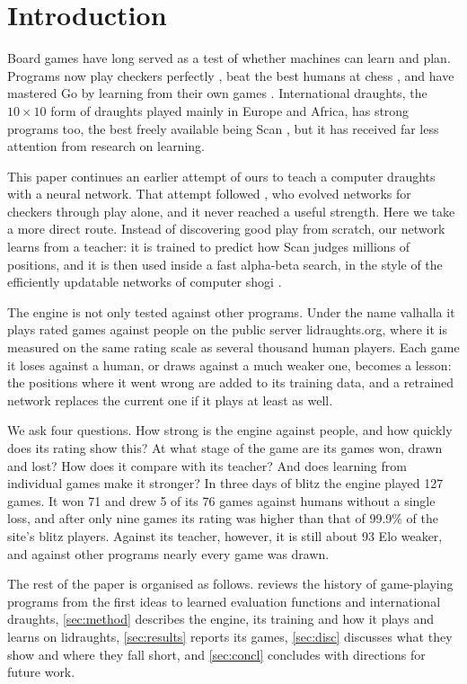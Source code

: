 \section{Introduction}\label{sec:intro}

Board games have long served as a test of whether machines can learn and plan.
Programs now play checkers perfectly \parencite{schaeffer2007}, beat the best
humans at chess \parencite{campbell2002}, and have mastered Go by learning from
their own games \parencite{silver2016,silver2018}. International draughts, the
$10\times10$ form of draughts played mainly in Europe and Africa, has strong
programs too, the best freely available being Scan \parencite{letouzey_scan},
but it has received far less attention from research on learning.

This paper continues an earlier attempt of ours to teach a computer draughts with
a neural network. That attempt followed \textcite{chellapilla1999}, who evolved
networks for checkers through play alone, and it never reached a useful
strength. Here we take a more direct route. Instead of discovering good play from
scratch, our network learns from a teacher: it is trained to predict how Scan
judges millions of positions, and it is then used inside a fast alpha-beta
search, in the style of the efficiently updatable networks of computer shogi
\parencite{nasu2018}.

The engine is not only tested against other programs. Under the name valhalla it
plays rated games against people on the public server lidraughts.org, where it is
measured on the same rating scale as several thousand human players. Each game it
loses against a human, or draws against a much weaker one, becomes a lesson: the
positions where it went wrong are added to its training data, and a retrained
network replaces the current one if it plays at least as well.

We ask four questions. How strong is the engine against people, and how quickly
does its rating show this? At what stage of the game are its games won, drawn and
lost? How does it compare with its teacher? And does learning from individual
games make it stronger? In three days of blitz the engine played 127 games. It
won 71 and drew 5 of its 76 games against humans without a single loss, and after
only nine games its rating was higher than that of 99.9\% of the site's blitz
players. Against its teacher, however, it is still about 93 Elo weaker, and
against other programs nearly every game was drawn.

The rest of the paper is organised as follows.  reviews the history
of game-playing programs from the first ideas to learned evaluation functions and
international draughts, \cref{sec:method} describes the engine, its training and
how it plays and learns on lidraughts, \cref{sec:results} reports its games,
\cref{sec:disc} discusses what they show and where they fall short, and
\cref{sec:concl} concludes with directions for future work.
